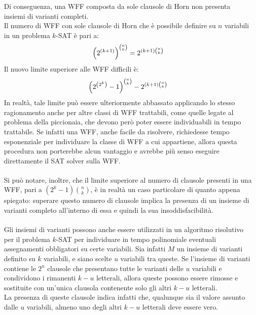 Di conseguenza, una WFF composta da sole clausole di Horn non presenta insiemi di varianti completi.\\
Il numero di WFF con sole clausole di Horn che è possibile definire su $n$ variabili in un problema $k$-SAT è pari a:
\begin{equation*}
    \left(2^{\left(k+1\right)}\right)^{\binom{n}{k}} = 2^{\left(k+1\right) \binom{n}{k}}
\end{equation*}
Il nuovo limite superiore alle WFF difficili è:
\begin{equation*}
    \left(2^{\left(2^k\right)} - 1\right)^{\binom{n}{k}} - 2^{\left(k + 1\right) \binom{n}{k}}
\end{equation*}
In realtà, tale limite può essere ulteriormente abbassato applicando lo stesso 
ragionamento anche per altre classi di WFF trattabili, come quelle legate al problema
della piccionaia, che devono però poter essere individuabili in tempo trattabile.
Se infatti una WFF, anche facile da risolvere, richiedesse tempo esponenziale per 
individuare la classe di WFF a cui appartiene, allora questa procedura non porterebbe
alcun vantaggio e avrebbe più senso eseguire direttamente il SAT solver sulla WFF.\\
\\
Si può notare, inoltre, che il limite superiore al numero di clausole presenti in una WFF,
pari a $(2^k - 1) \binom{n}{k}$, è in realtà un caso particolare di quanto appena
spiegato: superare questo 
numero di clausole implica la presenza di un insieme di varianti completo all'interno di 
essa e quindi la sua insoddisfacibilità.\\
\\
Gli insiemi di varianti possono anche essere utilizzati in un algoritmo
risolutivo per il problema $k$-SAT per individuare in tempo polinomiale eventuali
assegnamenti obbligatori su certe variabili.
Sia infatti $M$ un insieme di varianti definito su $k$ variabili, e 
siano scelte $u$ variabili tra queste. Se l'insieme di varianti contiene le $2^u$ clausole
che presentano tutte le varianti delle $u$ variabili e condividono i rimanenti $k-u$ 
letterali, allora queste possono essere rimosse e sostituite con un'unica clausola 
contenente solo gli altri $k-u$ letterali.\\
La presenza di queste clausole indica infatti che, qualunque sia il valore assunto dalle
$u$ variabili, almeno uno degli altri $k-u$ letterali deve essere vero.
